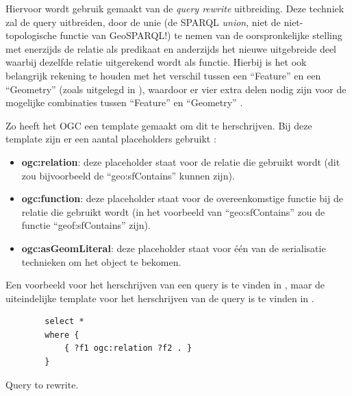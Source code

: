 Hiervoor wordt gebruik gemaakt van de \textit{query rewrite} uitbreiding. Deze techniek zal de query uitbreiden, door de unie (de SPARQL \textit{union}, niet de niet-topologische functie van GeoSPARQL!) te nemen van de oorspronkelijke stelling met enerzijds de relatie als predikaat en anderzijds het nieuwe uitgebreide deel waarbij dezelfde relatie uitgerekend wordt als functie. Hierbij is het ook belangrijk rekening te houden met het verschil tussen een ``Feature'' en een ``Geometry'' (zoals uitgelegd in ), waardoor er vier extra delen nodig zijn voor de mogelijke combinaties tussen ``Feature'' en ``Geometry'' \cite{ogcdocs}. 

Zo heeft het OGC een template gemaakt om dit te herschrijven. Bij deze template zijn er een aantal placeholders gebruikt \cite{ogcdocs}:
\begin{itemize}
    \item \textbf{ogc:relation}: deze placeholder staat voor de relatie die gebruikt wordt (dit zou bijvoorbeeld de ``geo:sfContains'' kunnen zijn).
    \item \textbf{ogc:function}: deze placeholder staat voor de overeenkomstige functie bij de relatie die gebruikt wordt (in het voorbeeld van ``geo:sfContains'' zou de functie ``geof:sfContains'' zijn).
    \item \textbf{ogc:asGeomLiteral}: deze placeholder staat voor één van de serialisatie technieken om het object te bekomen.
\end{itemize}

Een voorbeeld voor het herschrijven van een query is te vinden in , maar de uiteindelijke template voor het herschrijven van de query is te vinden in .

\begin{listing}[ht]
    \begin{verbatim}
        select *
        where {
            { ?f1 ogc:relation ?f2 . }
        }
    \end{verbatim}
    \caption{Query to rewrite.}
    \label{listing:geosparql_query_to_rewrite}
\end{listing}

